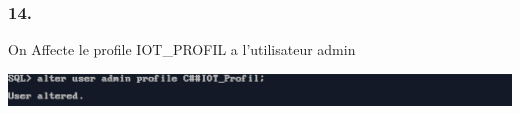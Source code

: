 \subsubsection*{14.}
On Affecte le profile IOT\_PROFIL a l'utilisateur admin



\begin{center}
    \includegraphics[width=\textwidth]{ScreenShot/Partie4/alterprof.png}
\end{center}

